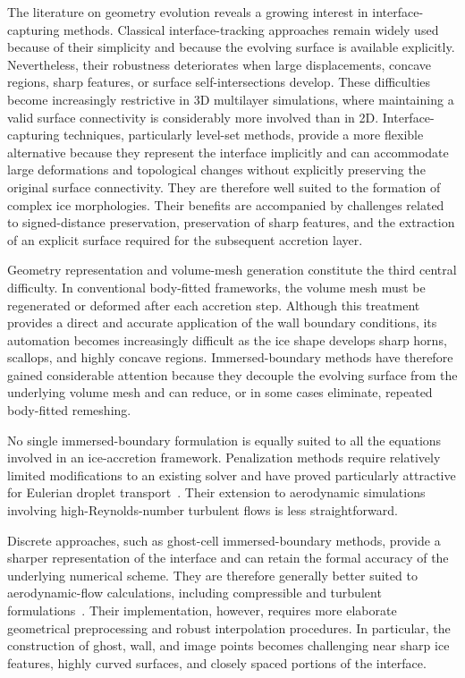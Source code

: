 The literature on geometry evolution reveals a growing interest in interface-capturing methods. Classical interface-tracking approaches remain widely used because of their simplicity and because the evolving surface is available explicitly. Nevertheless, their robustness deteriorates when large displacements, concave regions, sharp features, or surface self-intersections develop. These difficulties become increasingly restrictive in 3D multilayer simulations, where maintaining a valid surface connectivity is considerably more involved than in 2D. Interface-capturing techniques, particularly level-set methods, provide a more flexible alternative because they represent the interface implicitly and can accommodate large deformations and topological changes without explicitly preserving the original surface connectivity. They are therefore well suited to the formation of complex ice morphologies. Their benefits are accompanied by challenges related to signed-distance preservation, preservation of sharp features, and the extraction of an explicit surface required for the subsequent accretion layer.

Geometry representation and volume-mesh generation constitute the third central difficulty. In conventional body-fitted frameworks, the volume mesh must be regenerated or deformed after each accretion step. Although this treatment provides a direct and accurate application of the wall boundary conditions, its automation becomes increasingly difficult as the ice shape develops sharp horns, scallops, and highly concave regions. Immersed-boundary methods have therefore gained considerable attention because they decouple the evolving surface from the underlying volume mesh and can reduce, or in some cases eliminate, repeated body-fitted remeshing.

No single immersed-boundary formulation is equally suited to all the equations involved in an ice-accretion framework. Penalization methods require relatively limited modifications to an existing solver and have proved particularly attractive for Eulerian droplet transport~\cite{lavoie2021immersed,pabloIcing}. Their extension to aerodynamic simulations involving high-Reynolds-number turbulent flows is less straightforward.

Discrete approaches, such as ghost-cell immersed-boundary methods, provide a sharper representation of the interface and can retain the formal accuracy of the underlying numerical scheme. They are therefore generally better suited to aerodynamic-flow calculations, including compressible and turbulent formulations~\cite{pabloIcing}. Their implementation, however, requires more elaborate geometrical preprocessing and robust interpolation procedures. In particular, the construction of ghost, wall, and image points becomes challenging near sharp ice features, highly curved surfaces, and closely spaced portions of the interface.

